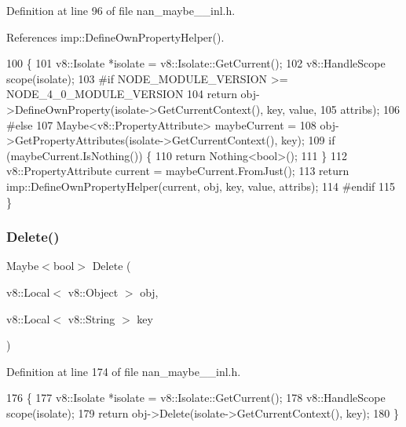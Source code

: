 Definition at line 96 of file nan\+\_\+maybe\+\_\+\_\+inl.\+h.



References imp\+::\+Define\+Own\+Property\+Helper().


\begin{DoxyCode}
100                                           \{
101   v8::Isolate *isolate = v8::Isolate::GetCurrent();
102   v8::HandleScope scope(isolate);
103 \textcolor{preprocessor}{#if NODE\_MODULE\_VERSION >= NODE\_4\_0\_MODULE\_VERSION}
104   \textcolor{keywordflow}{return} obj->DefineOwnProperty(isolate->GetCurrentContext(), key, value,
105                                 attribs);
106 \textcolor{preprocessor}{#else}
107   Maybe<v8::PropertyAttribute> maybeCurrent =
108       obj->GetPropertyAttributes(isolate->GetCurrentContext(), key);
109   \textcolor{keywordflow}{if} (maybeCurrent.IsNothing()) \{
110     \textcolor{keywordflow}{return} Nothing<bool>();
111   \}
112   v8::PropertyAttribute current = maybeCurrent.FromJust();
113   \textcolor{keywordflow}{return} imp::DefineOwnPropertyHelper(current, obj, key, value, attribs);
114 \textcolor{preprocessor}{#endif}
115 \}
\end{DoxyCode}
\mbox{\label{nan__maybe__43__inl_8h_afe141ecdff18e5e46f1e0e3f2e1a8574}} 
\subsubsection{Delete()\hspace{0.1cm}{\footnotesize\ttfamily [1/2]}}
{\footnotesize\ttfamily Maybe$<$bool$>$ Delete (\begin{DoxyParamCaption}\item[{v8\+::\+Local$<$ v8\+::\+Object $>$}]{obj,  }\item[{v8\+::\+Local$<$ v8\+::\+String $>$}]{key }\end{DoxyParamCaption})}



Definition at line 174 of file nan\+\_\+maybe\+\_\+\_\+inl.\+h.


\begin{DoxyCode}
176                            \{
177   v8::Isolate *isolate = v8::Isolate::GetCurrent();
178   v8::HandleScope scope(isolate);
179   \textcolor{keywordflow}{return} obj->Delete(isolate->GetCurrentContext(), key);
180 \}
\end{DoxyCode}
\mbox{\label{nan__maybe__43__inl_8h_ab44454199e044707f1169ab6ec4317fa}} 
